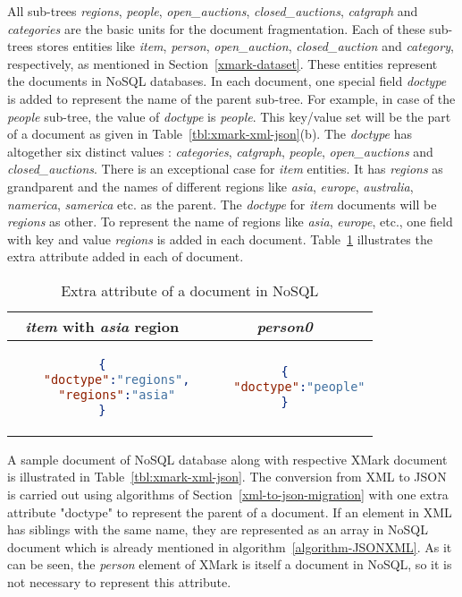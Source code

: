 All sub-trees \textit{regions}, \textit{people}, \textit{open\_auctions}, \textit{closed\_auctions}, \textit{catgraph} and \textit{categories} are the basic units for the document fragmentation. Each of these sub-trees stores entities like \textit{item}, \textit{person}, \textit{open\_auction}, \textit{closed\_auction} and \textit{category}, respectively, as mentioned in Section~\ref{xmark-dataset}. These entities represent the documents in NoSQL databases. In each document, one special field \textit{doctype} is added to represent the name of the parent sub-tree. For example, in case of the \textit{people} sub-tree, the value of \textit{doctype} is \textit{people}. This key/value set will be the part of a document as  given in Table~\ref{tbl:xmark-xml-json}(b). The \textit{doctype} has altogether six distinct values : \textit{categories}, \textit{catgraph}, \textit{people}, \textit{open\_auctions} and \textit{closed\_auctions}. There is an exceptional case for \textit{item} entities. It has \textit{regions} as grandparent and the names of different regions like \textit{asia}, \textit{europe}, \textit{australia}, \textit{namerica}, \textit{samerica} etc. as the parent.  The \textit{doctype} for \textit{item} documents will be \textit{regions} as other. To represent the name of regions like \textit{asia}, \textit{europe}, etc.,  one field with key and value \textit{regions} is added in each document. 
Table~\ref{tbl:xmark-item-type} illustrates the extra attribute added in each of document.
\begin{longtable}{c|c}
	\caption{ Extra attribute of a document in NoSQL}
	\label{tbl:xmark-item-type}\\
    {\textit{item}  with \textit{asia} region} & {\textit{person0} }\\
	\hline
\begin{minipage}{.4\textwidth}
\begin{lstlisting}[language=JSON,basicstyle=\ttfamily\footnotesize]
{
	"doctype":"regions",
	"regions":"asia"
}
\end{lstlisting}
\end{minipage}
& 
\begin{minipage}{.4\textwidth}
\begin{lstlisting}[language=JSON,basicstyle=\ttfamily\footnotesize]
{
	"doctype":"people"
}
\end{lstlisting}
\end{minipage} 
\end{longtable}
\newpage
A sample document of NoSQL database along with respective XMark document is illustrated in  Table~\ref{tbl:xmark-xml-json}. The conversion from XML to JSON is carried out using algorithms of Section~\ref{xml-to-json-migration} with one extra attribute "doctype" to represent the parent of a document. If an element in XML has siblings with the same name, they are represented as an array in NoSQL document which is already mentioned in algorithm~\ref{algorithm-JSONXML}. As it can be seen, the \textit{person} element of XMark is itself a document in NoSQL, so it is not necessary to represent this attribute.  
